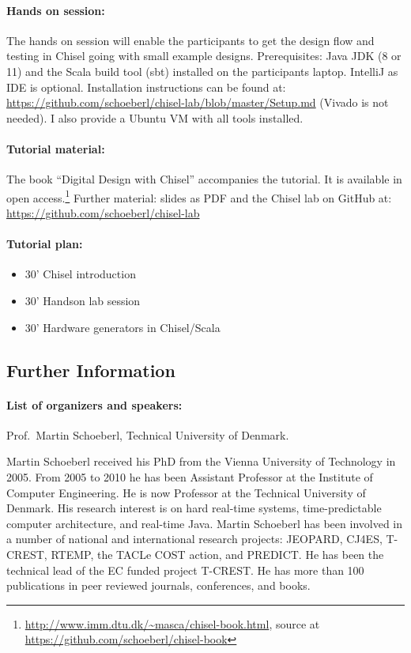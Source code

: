 \documentclass{article}
\begin{document}
 \paragraph{Hands on session:} The hands on session will enable the participants to get the design
 flow and testing in Chisel going with small example designs.
 Prerequisites: Java JDK (8 or 11) and the Scala build tool (sbt) installed on the participants laptop.
 IntelliJ as IDE is optional. Installation instructions can be found
at: \url{https://github.com/schoeberl/chisel-lab/blob/master/Setup.md} (Vivado is not needed).
I also provide a Ubuntu VM with all tools installed.

 \paragraph{Tutorial material:}
The book ``Digital Design with Chisel'' accompanies the tutorial.
It is available in open access.\footnote{\url{http://www.imm.dtu.dk/~masca/chisel-book.html}, source at \url{https://github.com/schoeberl/chisel-book}}
Further material: slides as PDF and the Chisel lab on GitHub at: \url{https://github.com/schoeberl/chisel-lab}



\paragraph{Tutorial plan:}

\begin{itemize}
\item 30' Chisel introduction
\item 30' Handson lab session
\item 30' Hardware generators in Chisel/Scala
\end{itemize}

\subsection*{Further Information}

\paragraph{List of organizers and speakers:}
Prof.~Martin Schoeberl, Technical University of Denmark.

Martin Schoeberl received his PhD from the Vienna University of Technology in 2005. From 2005 to 2010 he has been Assistant Professor at the Institute of Computer Engineering. He is now Professor at the Technical University of Denmark. His research interest is on hard real-time systems, time-predictable computer architecture, and real-time Java.  Martin Schoeberl has been involved in a number of national and international research projects: JEOPARD, CJ4ES, T-CREST, RTEMP, the TACLe COST action, and PREDICT.  He has been the technical lead of the EC funded project T-CREST.  He has more than 100 publications in peer reviewed journals, conferences, and books.
\end{document}

